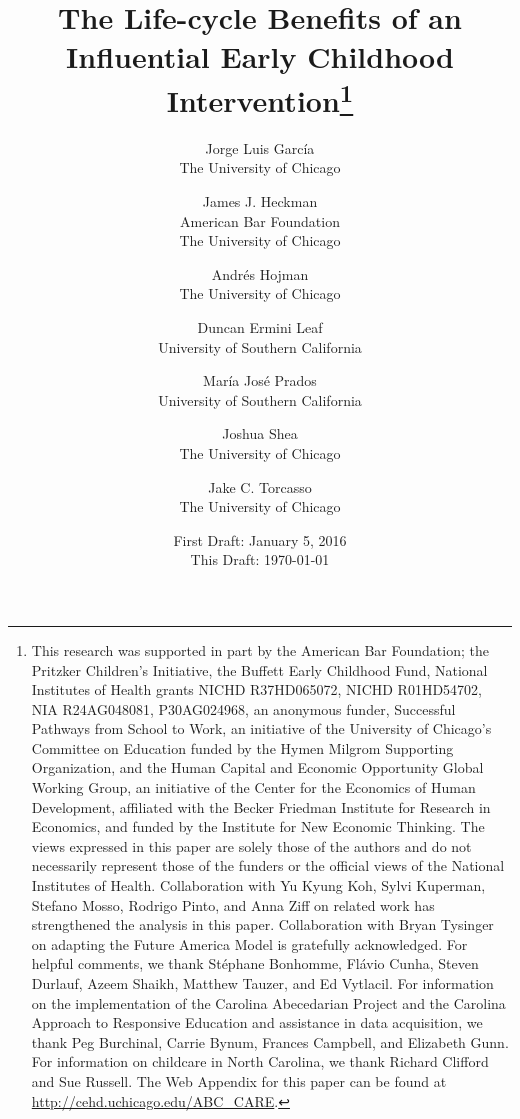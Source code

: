 






\begin{titlepage}

\title{\Large \textbf{The Life-cycle Benefits of an Influential Early Childhood Intervention}\thanks{This research was supported in part by the American Bar Foundation; the Pritzker Children's Initiative, the Buffett Early Childhood Fund, National Institutes of Health grants NICHD R37HD065072, NICHD R01HD54702, NIA R24AG048081, P30AG024968, an anonymous funder, Successful Pathways from School to Work, an initiative of the University of Chicago's Committee on Education funded by the Hymen Milgrom Supporting Organization, and the Human Capital and Economic Opportunity Global Working Group, an initiative of the Center for the Economics of Human Development, affiliated with the Becker Friedman Institute for Research in Economics, and funded by the Institute for New Economic Thinking. The views expressed in this paper are solely those of the authors and do not necessarily represent those of the funders or the official views of the National Institutes of Health. Collaboration with Yu Kyung Koh, Sylvi Kuperman, Stefano Mosso, Rodrigo Pinto, and Anna Ziff on related work has strengthened the analysis in this paper. Collaboration with Bryan Tysinger on adapting the Future America Model is gratefully acknowledged. For helpful comments, we thank St\'{e}phane Bonhomme, Fl\'{a}vio Cunha, Steven Durlauf, Azeem Shaikh, Matthew Tauzer, and Ed Vytlacil. For information on the implementation of the Carolina Abecedarian Project and the Carolina Approach to Responsive Education and assistance in data acquisition, we thank Peg Burchinal, Carrie Bynum, Frances Campbell, and Elizabeth Gunn. For information on childcare in North Carolina, we thank Richard Clifford and Sue Russell. The Web Appendix for this paper can be found at \url{http://cehd.uchicago.edu/ABC_CARE}.}}

\author{
Jorge Luis Garc\'{i}a\\
The University of Chicago \and
James J. Heckman \\
American Bar Foundation \\
The University of Chicago \and
Andr\'{e}s Hojman\\
The University of Chicago \and
Duncan Ermini Leaf \\
University of Southern California \and
Mar\'{i}a Jos\'{e} Prados \\
University of Southern California \and
Joshua Shea \\
The University of Chicago \and
Jake C. Torcasso\\
The University of Chicago}
\date{First Draft: January 5, 2016\\ This Draft: \today}

\maketitle

\end{titlepage}

